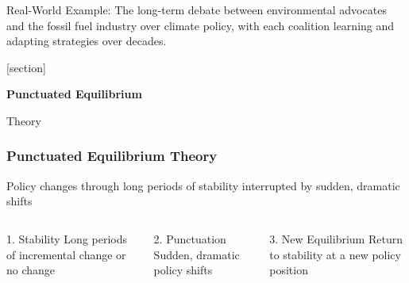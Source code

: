 \documentclass[10pt]{beamer}
\begin{document}
\begin{frame}
\pause
\vspace{0.5cm}

\begin{alertblock}{Real-World Example:}
  The long-term debate between environmental advocates and the fossil fuel industry over climate policy, with each coalition learning and adapting strategies over decades.
\end{alertblock}

\end{frame}

{
[section]
\begin{frame}[plain]
  \vspace{2cm}
  \begin{center}
    {\Huge\color{white}\textbf{Punctuated Equilibrium}}

    \vspace{0.5cm}
    {\Large\color{white}Theory}
  \end{center}
\end{frame}
}

\begin{frame}
\frametitle{Punctuated Equilibrium Theory}

\begin{block}{}
  \centering
  Policy changes through long periods of stability interrupted by sudden, dramatic shifts
\end{block}

\vspace{0.5cm}

\begin{columns}
  \begin{column}{0.32\textwidth}
    \begin{block}{\textcolor{equilibriumgreen}{1. Stability}}
      \pause
      Long periods of incremental change or no change
    \end{block}
  \end{column}

  \begin{column}{0.32\textwidth}
    \begin{block}{\textcolor{punctuationorange}{2. Punctuation}}
      \pause
      Sudden, dramatic policy shifts
    \end{block}
  \end{column}

  \begin{column}{0.32\textwidth}
    \begin{block}{\textcolor{equilibriumgreen}{3. New Equilibrium}}
      \pause
      Return to stability at a new policy position
    \end{block}
  \end{column}
\end{columns}

\end{frame}
\end{document}
